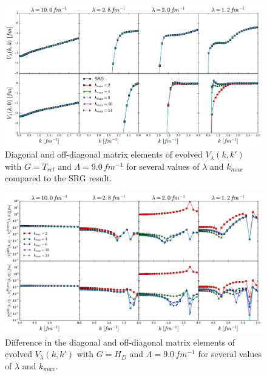 \documentclass[preprintnumbers,floatfix,aps,prc,preprint]{revtex4-1}
\begin{document}
\begin{figure}[H]
  \centering
  \includegraphics[width=15cm]{mag_diags_offdiags_Wendt_9_Wilson}
   \hspace*{0.05\textwidth}%
  \caption{Diagonal and off-diagonal matrix elements of evolved $V_{\lambda}(k,k')$ with $G=T_{rel}$ and $\Lambda=9.0 \, fm^{-1}$ for several values of $\lambda$ and $k_{max}$ compared to the SRG result.}
  \label{fig:mag_diags_offdiags_Wendt_9_Wilson}
\end{figure}
%
\begin{figure}[H]
  \centering
  \includegraphics[width=15cm]{mag_diff_Wendt_9_Wegner}
   \hspace*{0.05\textwidth}%
  \caption{Difference in the diagonal and off-diagonal matrix elements of evolved $V_{\lambda}(k,k')$ with $G=H_D$ and $\Lambda=9.0 \, fm^{-1}$ for several values of $\lambda$ and $k_{max}$.}
  \label{fig:mag_diff_Wendt_9_Wegner}
\end{figure}
%
\newpage
%
\end{document}
